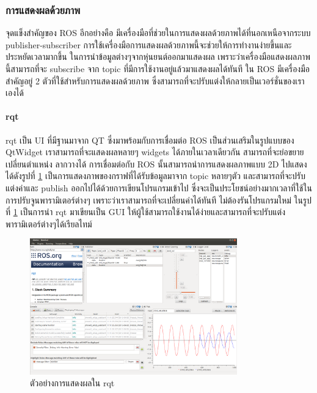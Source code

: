 \subsubsection*{การแสดงผลด้วยภาพ}
จุดแข็งสำคัญของ ROS อีกอย่างคือ มีเครื่องมือที่ช่วยในการแสดงผลด้วยภาพได้ที่นอกเหนือจากระบบ
publisher-subscriber การใช้เครื่องมือการแสดงผลด้วยภาพนี้จะช่วยให้การทำงานง่ายขึ้นและประหยัดเวลามากขึ้น
ในการนำข้อมูลต่างๆจากหุ่นยนต์ออกมาแสดงผล เพราะว่าเครื่องมือแสดงผลภาพนี้สามารถที่จะ subscribe
จาก topic ที่มีการใช้งานอยู่แล้วมาแสดงผลได้ทันที ใน ROS มีเครื่องมือสำคัญอยู่ 2 ตัวที่ใช้สำหรับการแสดงผลด้วยภาพ
ซึ่งสามารถที่จะปรับแต่งให้กลายเป็นเวอร์ชั่นของเราเองได้

\paragraph*{rqt}
rqt เป็น UI ที่มีฐานมาจาก QT ซึ่งมาพร้อมกับการเชื่อมต่อ ROS เป็นส่วนเสริมในรูปแบบของ QtWidget
เราสามารถที่จะแสดงผลหลายๆ widgets ได้ภายในเวลาเดียวกัน สามารถที่จะย่อขยาย เปลี่ยนตำแหน่ง
ลากวางได้ การเชื่อมต่อกับ ROS นั้นสามารถนำการแสดงผลภาพแบบ 2D ไปแสดงได้ดังรูปที่ \ref{fig:ros_gui_example}
เป็นการแสดงภาพของกราฟที่ได้รับข้อมูลมาจาก topic หลายๆตัว และสามารถที่จะปรับแต่งค่าและ publish
ออกไปได้ด้วยการเขียนโปรแกรมเข้าไป ซึ่งจะเป็นประโยชน์อย่างมากเวลาที่ใช้ในการปรับจูนพารามิเตอร์ต่างๆ
เพราะว่าเราสามารถที่จะเปลี่ยนค่าได้ทันที ไม่ต้องรันโปรแกรมใหม่ ในรูปที่ \ref{fig:ros_gui_example}
เป็นการนำ rqt มาเขียนเป็น GUI ให้ผู้ใช้สามารถใช้งานได้ง่ายและสามารถที่จะปรับแต่งพารามิเตอร์ต่างๆได้เรียลไทม์

\begin{figure}[!ht]
    \centering
    \includegraphics[width=0.8\textwidth]{chapter2/images/ros_gui_example.png}
	\caption{ตัวอย่างการแสดงผลใน rqt }
    \label{fig:ros_gui_example}
\end{figure}

